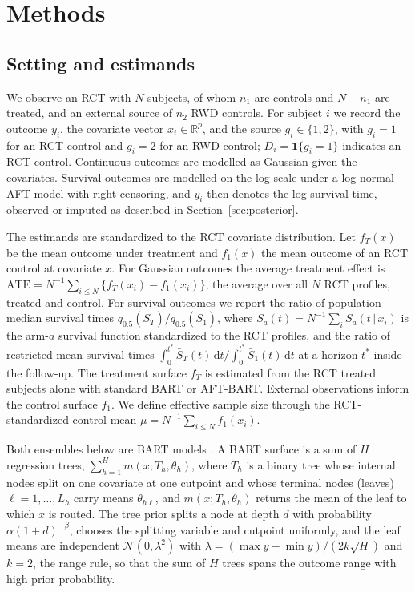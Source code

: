 \documentclass[11pt]{article}
\newcommand{\Normal}{\mathcal{N}}
\newcommand{\given}{\,\vert\,}
\newcommand{\dd}{\mathrm{d}}
\theoremstyle{definition}
\theoremstyle{plain}
\begin{document}
\section{Methods}
\label{sec:methods}

\subsection{Setting and estimands}
\label{sec:setting}

We observe an RCT with $N$ subjects, of whom $n_1$ are controls and $N-n_1$ are treated, and an external source of $n_2$ RWD controls. For subject $i$ we record the outcome $y_i$, the covariate vector $x_i\in\mathbb R^p$, and the source $g_i\in\{1,2\}$, with $g_i=1$ for an RCT control and $g_i=2$ for an RWD control; $D_i=\mathbf 1\{g_i=1\}$ indicates an RCT control. Continuous outcomes are modelled as Gaussian given the covariates. Survival outcomes are modelled on the log scale under a log-normal AFT model with right censoring, and $y_i$ then denotes the log survival time, observed or imputed as described in Section~\ref{sec:posterior}.

The estimands are standardized to the RCT covariate distribution. Let $f_T(x)$ be the mean outcome under treatment and $f_1(x)$ the mean outcome of an RCT control at covariate $x$. For Gaussian outcomes the average treatment effect is $\mathrm{ATE}=N^{-1}\sum_{i\le N}\{f_T(x_i)-f_1(x_i)\}$, the average over all $N$ RCT profiles, treated and control. For survival outcomes we report the ratio of population median survival times $q_{0.5}(\bar S_T)/q_{0.5}(\bar S_1)$, where $\bar S_a(t)=N^{-1}\sum_i S_a(t\given x_i)$ is the arm-$a$ survival function standardized to the RCT profiles, and the ratio of restricted mean survival times $\int_0^{t^\ast}\bar S_T(t)\,\dd t/\int_0^{t^\ast}\bar S_1(t)\,\dd t$ at a horizon $t^\ast$ inside the follow-up. The treatment surface $f_T$ is estimated from the RCT treated subjects alone with standard BART or AFT-BART. External observations inform the control surface $f_1$. We define effective sample size through the RCT-standardized control mean $\mu=N^{-1}\sum_{i\le N}f_1(x_i)$.

Both ensembles below are BART models \citep{Chipman2010BART}. A BART surface is a sum of $H$ regression trees, $\sum_{h=1}^H m(x;T_h,\theta_h)$, where $T_h$ is a binary tree whose internal nodes split on one covariate at one cutpoint and whose terminal nodes (leaves) $\ell=1,\dots,L_h$ carry means $\theta_{h\ell}$, and $m(x;T_h,\theta_h)$ returns the mean of the leaf to which $x$ is routed. The tree prior splits a node at depth $d$ with probability $\alpha(1+d)^{-\beta}$, chooses the splitting variable and cutpoint uniformly, and the leaf means are independent $\Normal(0,\lambda^2)$ with $\lambda=(\max y-\min y)/(2k\sqrt H)$ and $k=2$, the range rule, so that the sum of $H$ trees spans the outcome range with high prior probability.
\end{document}
